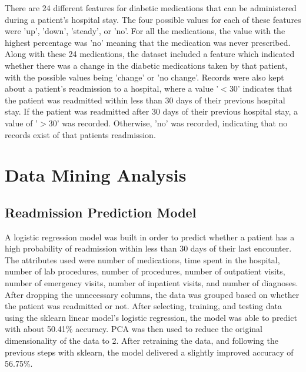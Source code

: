 \documentclass{neu_handout}
\begin{document}
There are 24 different features for diabetic medications that can be administered during a patient's hospital stay. The four possible values for each of these features were 'up', 'down', 'steady', or 'no'. For all the medications, the value with the highest percentage was 'no' meaning that the medication was never prescribed. Along with these 24 medications, the dataset included a feature which indicated whether there was a change in the diabetic medications taken by that patient, with the possible values being 'change' or 'no change'. Records were also kept about a patient's readmission to a hospital, where a value '$<$30' indicates that the patient was readmitted within less than 30 days of their previous hospital stay. If the patient was readmitted after 30 days of their previous hospital stay, a value of '$>$30' was recorded. Otherwise, 'no' was recorded, indicating that no records exist of that patients readmission.

\section*{Data Mining Analysis}

\subsection*{Readmission Prediction Model}
A logistic regression model was built in order to predict whether a patient has a high probability of readmission within less than 30 days of their last encounter. The attributes used were number of medications, time spent in the hospital, number of lab procedures, number of procedures, number of outpatient visits, number of emergency visits, number of inpatient visits, and number of diagnoses. After dropping the unnecessary columns, the data was grouped based on whether the patient was readmitted or not. After selecting, training, and testing data using the sklearn linear model's logistic regression, the model was able to predict with about 50.41\% accuracy. PCA was then used to reduce the original dimensionality of the data to 2. After retraining the data, and following the previous steps with sklearn, the model delivered a slightly improved accuracy of 56.75\%.
\end{document}
